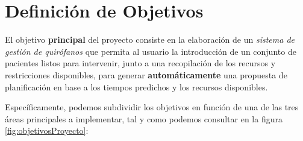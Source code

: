 
\section{Definición de Objetivos}

El objetivo \textbf{principal} del proyecto consiste en la elaboración de un \textit{sistema de gestión de quirófanos} que permita al usuario la introducción de un conjunto de pacientes listos para intervenir, junto a una recopilación de los recursos y restricciones disponibles, para generar \textbf{automáticamente} una propuesta de planificación en base a los tiempos predichos y los recursos disponibles.

Específicamente, podemos subdividir los objetivos en función de una de las tres áreas principales a implementar, tal y como podemos consultar en la figura \ref{fig:objetivosProyecto}:


